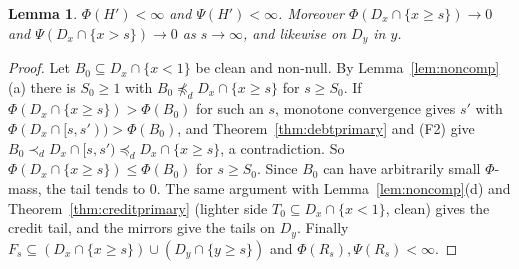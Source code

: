 \documentclass[11pt]{article}
\newtheorem{lemma}[theorem]{Lemma}
\theoremstyle{definition}\newtheorem{definition}[theorem]{Definition}
\theoremstyle{remark}\newtheorem{remark}[theorem]{Remark}
\begin{document}
\begin{lemma}\label{lem:totals}
$\Phi(H')<\infty$ and $\Psi(H')<\infty$. Moreover
$\Phi(D_x\cap\{x\ge s\})\to0$ and $\Psi(D_x\cap\{x>s\})\to0$ as $s\to\infty$,
and likewise on $D_y$ in $y$.
\end{lemma}
\begin{proof}
Let $B_0\subseteq D_x\cap\{x<1\}$ be clean and non-null. By
Lemma~\ref{lem:noncomp}(a) there is $S_0\ge1$ with $B_0\not\preceq_d
D_x\cap\{x\ge s\}$ for $s\ge S_0$. If $\Phi(D_x\cap\{x\ge s\})>\Phi(B_0)$ for
such an $s$, monotone convergence gives $s'$ with $\Phi(D_x\cap[s,s'))>
\Phi(B_0)$, and Theorem~\ref{thm:debtprimary} and (F2) give
$B_0\prec_dD_x\cap[s,s')\preceq_dD_x\cap\{x\ge s\}$, a contradiction. So
$\Phi(D_x\cap\{x\ge s\})\le\Phi(B_0)$ for $s\ge S_0$. Since $B_0$ can have
arbitrarily small $\Phi$-mass, the tail tends to $0$. The same argument with
Lemma~\ref{lem:noncomp}(d) and Theorem~\ref{thm:creditprimary} (lighter side
$T_0\subseteq D_x\cap\{x<1\}$, clean) gives the credit tail, and the mirrors
give the tails on $D_y$. Finally $F_s\subseteq(D_x\cap\{x\ge s\})\cup(D_y
\cap\{y\ge s\})$ and $\Phi(R_s),\Psi(R_s)<\infty$.
\end{proof}
\end{document}
